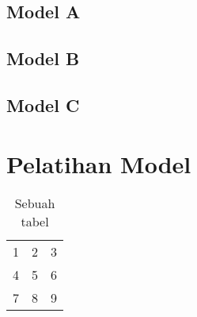 \subsection{Model A}
\subsection{Model B}
\subsection{Model C}

\section{Pelatihan Model} \label{sec:3-PelatihanModel}

\begin{table}[htbp]
    \captionsetup{labelfont=bf, textfont=bf}
    \caption{Sebuah tabel}
    \vspace{-20pt}
    \begin{center}
        \begin{tabular}{| l c r |}
            \hline
            1 & 2 & 3 \\
            4 & 5 & 6 \\
            7 & 8 & 9 \\
            \hline
        \end{tabular}
    \end{center}
    \vspace{-10pt}
    \captionsetup{labelfont=md, textfont=md}
\end{table}